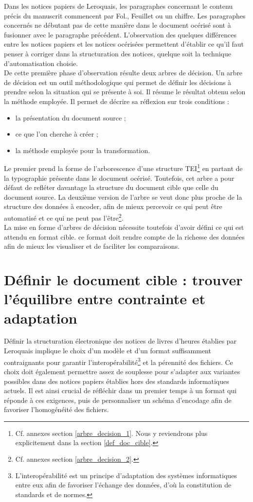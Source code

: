 \documentclass[a4paper,12pt,twoside]{book}
\begin{document}
	Dans les notices papiers de Leroquais, les paragraphes concernant le contenu précis du manuscrit commencent par \og Fol.\fg{}, \og Feuillet\fg{} ou un chiffre. Les paragraphes concernés ne débutant pas de cette manière dans le document océrisé sont à fusionner avec le paragraphe précédent. L'observation des quelques différences entre les notices papiers et les notices océrisées permettent d'établir ce qu'il faut penser à corriger dans la structuration des notices, quelque soit la technique d'automatisation choisie. \\
	
	De cette première phase d'observation résulte deux arbres de décision. Un arbre de décision est un outil méthodologique qui permet de définir les décisions à prendre selon la situation qui se présente à soi. Il résume le résultat obtenu selon la méthode employée. Il permet de décrire sa réflexion sur trois conditions :
	\begin{itemize}
	    \item la présentation du document source ;
	    \item ce que l'on cherche à créer ;
	    \item la méthode employée pour la transformation.
	\end{itemize}
	Le premier prend la forme de l'arborescence d'une structure TEI\footnote{Cf. annexes section \ref{arbre_decision_1}. Nous y reviendrons plus explicitement dans la section \ref{def_doc_cible}.} en partant de la typographie présente dans le document océrisé. Toutefois, cet arbre a pour défaut de refléter davantage la structure du document cible que celle du document source. La deuxième version de l'arbre se veut donc plus proche de la structure des données à encoder, afin de mieux percevoir ce qui peut être automatisé et ce qui ne peut pas l'être\footnote{Cf. annexes section \ref{arbre_decision_2}.}.\\
	
	La mise en forme d'arbres de décision nécessite toutefois d'avoir défini ce qui est attendu en format cible. ce format doit rendre compte de la richesse des données afin de mieux les visualiser et de faciliter les comparaisons. 
	
	
	\section{\label{def_doc_cible}Définir le document cible : trouver l’équilibre entre contrainte et adaptation}
	
	Définir la structuration électronique des notices de livres d'heures établies par Leroquais implique le choix d'un modèle et d'un format suffisamment contraignants pour garantir l'interopérabilité\footnote{L'interopérabilité est un principe d'adaptation des systèmes informatiques entre eux afin de favoriser l'échange des données, d'où la constitution de standards et de normes.} et la pérennité des fichiers. Ce choix doit également permettre assez de souplesse pour s'adapter aux variantes possibles dans des notices papiers établies hors des standards informatiques actuels. Il est ainsi crucial de réfléchir dans un premier temps à un format qui réponde à ces exigences, puis de personnaliser un schéma d'encodage afin de favoriser l'homogénéité des fichiers. 
\end{document}

